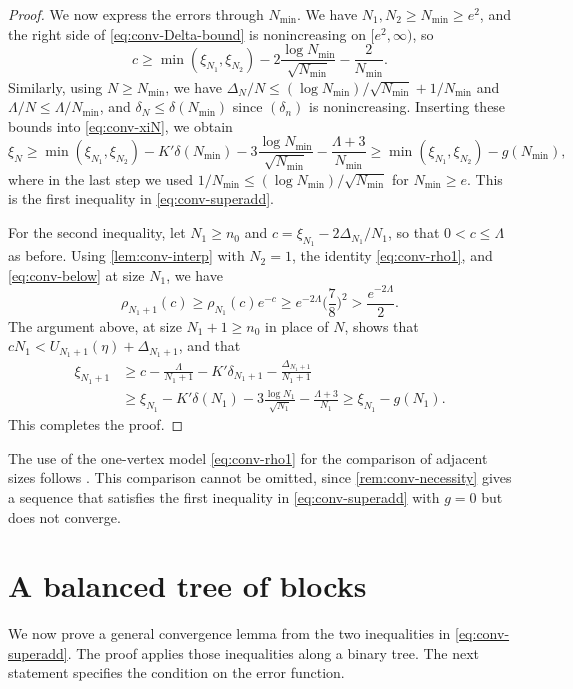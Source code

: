 \begin{proof}
We now express the errors through $N_{\min}$. We have $N_1, N_2 \ge N_{\min} \ge e^2$, and the right side of \eqref{eq:conv-Delta-bound} is nonincreasing on $[e^2, \infty)$, so
\[
c \ge \min(\xi_{N_1}, \xi_{N_2}) - 2 \frac{\log N_{\min}}{\sqrt{N_{\min}}} - \frac{2}{N_{\min}}.
\]
Similarly, using $N \ge N_{\min}$, we have $\Delta_N/N \le (\log N_{\min})/\sqrt{N_{\min}} + 1/N_{\min}$ and $\Lambda/N \le \Lambda/N_{\min}$, and $\delta_N \le \delta(N_{\min})$ since $(\delta_n)$ is nonincreasing. Inserting these bounds into \eqref{eq:conv-xiN}, we obtain
\[
\xi_N \ge \min(\xi_{N_1}, \xi_{N_2}) - K' \delta(N_{\min}) - 3 \frac{\log N_{\min}}{\sqrt{N_{\min}}} - \frac{\Lambda + 3}{N_{\min}} \ge \min(\xi_{N_1}, \xi_{N_2}) - g(N_{\min}),
\]
where in the last step we used $1/N_{\min} \le (\log N_{\min})/\sqrt{N_{\min}}$ for $N_{\min} \ge e$. This is the first inequality in \eqref{eq:conv-superadd}.

For the second inequality, let $N_1 \ge n_0$ and $c = \xi_{N_1} - 2\Delta_{N_1}/N_1$, so that $0 < c \le \Lambda$ as before. Using \cref{lem:conv-interp} with $N_2 = 1$, the identity \eqref{eq:conv-rho1}, and \eqref{eq:conv-below} at size $N_1$, we have
\[
\rho_{N_1 + 1}(c) \ge \rho_{N_1}(c) e^{-c} \ge e^{-2\Lambda} \Big(\frac 78\Big)^2 > \frac{e^{-2\Lambda}}{2}.
\]
The argument above, at size $N_1 + 1 \ge n_0$ in place of $N$, shows that $c N_1 < U_{N_1 + 1}(\eta) + \Delta_{N_1 + 1}$, and that
\[
\begin{aligned}
\xi_{N_1 + 1} &\ge c - \frac{\Lambda}{N_1 + 1} - K' \delta_{N_1 + 1} - \frac{\Delta_{N_1 + 1}}{N_1 + 1}\\
&\ge \xi_{N_1} - K' \delta(N_1) - 3 \frac{\log N_1}{\sqrt{N_1}} - \frac{\Lambda + 3}{N_1} \ge \xi_{N_1} - g(N_1).
\end{aligned}
\]
This completes the proof.
\end{proof}

The use of the one-vertex model \eqref{eq:conv-rho1} for the comparison of adjacent sizes follows \cite[Section~5.3]{openai2026limiting}. This comparison cannot be omitted, since \cref{rem:conv-necessity} gives a sequence that satisfies the first inequality in \eqref{eq:conv-superadd} with $g = 0$ but does not converge.

\section{A balanced tree of blocks}\label{sec:conv-tree}

We now prove a general convergence lemma from the two inequalities in \eqref{eq:conv-superadd}. The proof applies those inequalities along a binary tree. The next statement specifies the condition on the error function.

